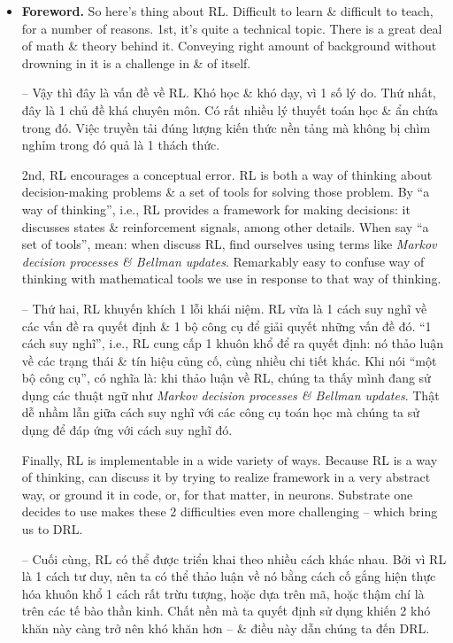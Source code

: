 \documentclass{article}
\begin{document}
\begin{itemize}
    \item {\bf Foreword.} So here's thing about RL. Difficult to learn \& difficult to teach, for a number of reasons. 1st, it's quite a technical topic. There is a great deal of math \& theory behind it. Conveying right amount of background without drowning in it is a challenge in \& of itself.

    -- Vậy thì đây là vấn đề về RL. Khó học \& khó dạy, vì 1 số lý do. Thứ nhất, đây là 1 chủ đề khá chuyên môn. Có rất nhiều lý thuyết toán học \& ẩn chứa trong đó. Việc truyền tải đúng lượng kiến thức nền tảng mà không bị chìm nghỉm trong đó quả là 1 thách thức.

    2nd, RL encourages a conceptual error. RL is both a way of thinking about decision-making problems \& a set of tools for solving those problem. By ``a way of thinking'', i.e., RL provides a framework for making decisions: it discusses states \& reinforcement signals, among other details. When say ``a set of tools'', mean: when discuss RL, find ourselves using terms like {\it Markov decision processes \& Bellman updates}. Remarkably easy to confuse way of thinking with mathematical tools we use in response to that way of thinking.

    -- Thứ hai, RL khuyến khích 1 lỗi khái niệm. RL vừa là 1 cách suy nghĩ về các vấn đề ra quyết định \& 1 bộ công cụ để giải quyết những vấn đề đó. ``1 cách suy nghĩ'', i.e., RL cung cấp 1 khuôn khổ để ra quyết định: nó thảo luận về các trạng thái \& tín hiệu củng cố, cùng nhiều chi tiết khác. Khi nói ``một bộ công cụ'', có nghĩa là: khi thảo luận về RL, chúng ta thấy mình đang sử dụng các thuật ngữ như {\it Markov decision processes \& Bellman updates}. Thật dễ nhầm lẫn giữa cách suy nghĩ với các công cụ toán học mà chúng ta sử dụng để đáp ứng với cách suy nghĩ đó.

    Finally, RL is implementable in a wide variety of ways. Because RL is a way of thinking, can discuss it by trying to realize framework in a very abstract way, or ground it in code, or, for that matter, in neurons. Substrate one decides to use makes these 2 difficulties even more challenging -- which bring us to DRL.

    -- Cuối cùng, RL có thể được triển khai theo nhiều cách khác nhau. Bởi vì RL là 1 cách tư duy, nên ta có thể thảo luận về nó bằng cách cố gắng hiện thực hóa khuôn khổ 1 cách rất trừu tượng, hoặc dựa trên mã, hoặc thậm chí là trên các tế bào thần kinh. Chất nền mà ta quyết định sử dụng khiến 2 khó khăn này càng trở nên khó khăn hơn -- \& điều này dẫn chúng ta đến DRL.


\end{itemize}
\end{document}
